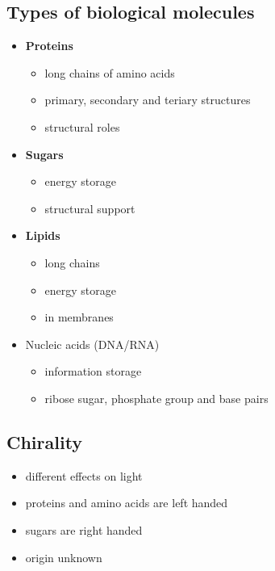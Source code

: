 \documentclass{article}
\theoremstyle{sltheorem}
\begin{document}
\subsection{Types of biological molecules}
\begin{itemize}
	\item \textbf{Proteins}
	      \begin{itemize}
		      \item long chains of amino acids
		      \item primary, secondary and teriary structures
		      \item structural roles
	      \end{itemize}
	\item \textbf{Sugars}
	      \begin{itemize}
		      \item energy storage
		      \item structural support
	      \end{itemize}
	\item \textbf{Lipids}
	      \begin{itemize}
		      \item long chains
		      \item energy storage
		      \item in membranes
	      \end{itemize}
	\item Nucleic acids (DNA/RNA)
	      \begin{itemize}
		      \item information storage
		      \item ribose sugar, phosphate group and base pairs
	      \end{itemize}
\end{itemize}
\subsection{Chirality}
\begin{itemize}
	\item different effects on light
	\item proteins and amino acids are left handed
	\item sugars are right handed
	\item origin unknown
\end{itemize}
\end{document}
